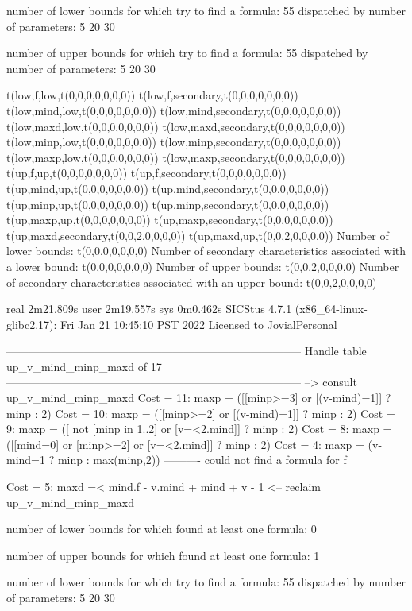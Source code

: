 number of lower bounds for which try to find a formula: 55
dispatched by number of parameters: 5  20  30

number of upper bounds for which try to find a formula: 55
dispatched by number of parameters: 5  20  30

t(low,f,low,t(0,0,0,0,0,0,0))
t(low,f,secondary,t(0,0,0,0,0,0,0))
t(low,mind,low,t(0,0,0,0,0,0,0))
t(low,mind,secondary,t(0,0,0,0,0,0,0))
t(low,maxd,low,t(0,0,0,0,0,0,0))
t(low,maxd,secondary,t(0,0,0,0,0,0,0))
t(low,minp,low,t(0,0,0,0,0,0,0))
t(low,minp,secondary,t(0,0,0,0,0,0,0))
t(low,maxp,low,t(0,0,0,0,0,0,0))
t(low,maxp,secondary,t(0,0,0,0,0,0,0))
t(up,f,up,t(0,0,0,0,0,0,0))
t(up,f,secondary,t(0,0,0,0,0,0,0))
t(up,mind,up,t(0,0,0,0,0,0,0))
t(up,mind,secondary,t(0,0,0,0,0,0,0))
t(up,minp,up,t(0,0,0,0,0,0,0))
t(up,minp,secondary,t(0,0,0,0,0,0,0))
t(up,maxp,up,t(0,0,0,0,0,0,0))
t(up,maxp,secondary,t(0,0,0,0,0,0,0))
t(up,maxd,secondary,t(0,0,2,0,0,0,0))
t(up,maxd,up,t(0,0,2,0,0,0,0))
Number of lower bounds:                                             t(0,0,0,0,0,0,0)
Number of secondary characteristics associated with a lower bound:  t(0,0,0,0,0,0,0)
Number of upper bounds:                                             t(0,0,2,0,0,0,0)
Number of secondary characteristics associated with an upper bound: t(0,0,2,0,0,0,0)

real	2m21.809s
user	2m19.557s
sys	0m0.462s
SICStus 4.7.1 (x86_64-linux-glibc2.17): Fri Jan 21 10:45:10 PST 2022
Licensed to JovialPersonal


--------------------------------------------------------------------------------
Handle table up_v_mind_minp_maxd of 17
--------------------------------------------------------------------------------
--> consult up_v_mind_minp_maxd
Cost = 11:  maxp = ([[minp>=3] or [(v-mind)=1]] ? minp : 2)
Cost = 10:  maxp = ([[minp>=2] or [(v-mind)=1]] ? minp : 2)
Cost =  9:  maxp = ([ not [minp in 1..2] or [v=<2.mind]] ? minp : 2)
Cost =  8:  maxp = ([[mind=0] or [minp>=2] or [v=<2.mind]] ? minp : 2)
Cost =  4:  maxp = (v-mind=1 ? minp : max(minp,2))
----------
could not find a formula for f

Cost =  5:  maxd =< mind.f - v.mind + mind + v - 1
<-- reclaim up_v_mind_minp_maxd

number of lower bounds for which found at least one formula: 0

number of upper bounds for which found at least one formula: 1

number of lower bounds for which try to find a formula: 55
dispatched by number of parameters: 5  20  30

